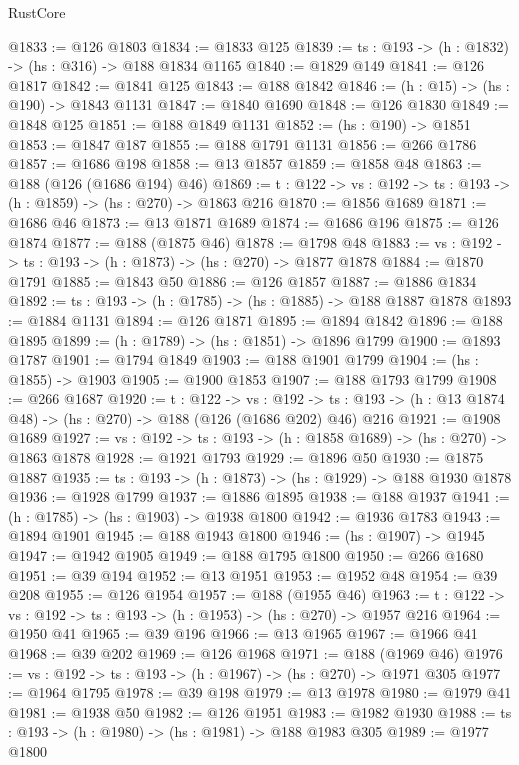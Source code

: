 \begin{lexlean}{RustCore}
\begin{coremodule}
@1833 := @126 @1803
@1834 := @1833 @125
@1839 := {ts : @193} -> (h : @1832) -> (hs : @316) -> @188 @1834 @1165
@1840 := @1829 @149
@1841 := @126 @1817
@1842 := @1841 @125
@1843 := @188 @1842
@1846 := (h : @15) -> (hs : @190) -> @1843 @1131
@1847 := @1840 @1690
@1848 := @126 @1830
@1849 := @1848 @125
@1851 := @188 @1849 @1131
@1852 := (hs : @190) -> @1851
@1853 := @1847 @187
@1855 := @188 @1791 @1131
@1856 := @266 @1786
@1857 := @1686 @198
@1858 := @13 @1857
@1859 := @1858 @48
@1863 := @188 (@126 (@1686 @194) @46)
@1869 := {t : @122} -> {vs : @192} -> {ts : @193} -> (h : @1859) -> (hs : @270) -> @1863 @216
@1870 := @1856 @1689
@1871 := @1686 @46
@1873 := @13 @1871 @1689
@1874 := @1686 @196
@1875 := @126 @1874
@1877 := @188 (@1875 @46)
@1878 := @1798 @48
@1883 := {vs : @192} -> {ts : @193} -> (h : @1873) -> (hs : @270) -> @1877 @1878
@1884 := @1870 @1791
@1885 := @1843 @50
@1886 := @126 @1857
@1887 := @1886 @1834
@1892 := {ts : @193} -> (h : @1785) -> (hs : @1885) -> @188 @1887 @1878
@1893 := @1884 @1131
@1894 := @126 @1871
@1895 := @1894 @1842
@1896 := @188 @1895
@1899 := (h : @1789) -> (hs : @1851) -> @1896 @1799
@1900 := @1893 @1787
@1901 := @1794 @1849
@1903 := @188 @1901 @1799
@1904 := (hs : @1855) -> @1903
@1905 := @1900 @1853
@1907 := @188 @1793 @1799
@1908 := @266 @1687
@1920 := {t : @122} ->
  {vs : @192} ->
  {ts : @193} -> (h : @13 @1874 @48) -> (hs : @270) -> @188 (@126 (@1686 @202) @46) @216
@1921 := @1908 @1689
@1927 := {vs : @192} -> {ts : @193} -> (h : @1858 @1689) -> (hs : @270) -> @1863 @1878
@1928 := @1921 @1793
@1929 := @1896 @50
@1930 := @1875 @1887
@1935 := {ts : @193} -> (h : @1873) -> (hs : @1929) -> @188 @1930 @1878
@1936 := @1928 @1799
@1937 := @1886 @1895
@1938 := @188 @1937
@1941 := (h : @1785) -> (hs : @1903) -> @1938 @1800
@1942 := @1936 @1783
@1943 := @1894 @1901
@1945 := @188 @1943 @1800
@1946 := (hs : @1907) -> @1945
@1947 := @1942 @1905
@1949 := @188 @1795 @1800
@1950 := @266 @1680
@1951 := @39 @194
@1952 := @13 @1951
@1953 := @1952 @48
@1954 := @39 @208
@1955 := @126 @1954
@1957 := @188 (@1955 @46)
@1963 := {t : @122} -> {vs : @192} -> {ts : @193} -> (h : @1953) -> (hs : @270) -> @1957 @216
@1964 := @1950 @41
@1965 := @39 @196
@1966 := @13 @1965
@1967 := @1966 @41
@1968 := @39 @202
@1969 := @126 @1968
@1971 := @188 (@1969 @46)
@1976 := {vs : @192} -> {ts : @193} -> (h : @1967) -> (hs : @270) -> @1971 @305
@1977 := @1964 @1795
@1978 := @39 @198
@1979 := @13 @1978
@1980 := @1979 @41
@1981 := @1938 @50
@1982 := @126 @1951
@1983 := @1982 @1930
@1988 := {ts : @193} -> (h : @1980) -> (hs : @1981) -> @188 @1983 @305
@1989 := @1977 @1800

\end{coremodule}
\end{lexlean}
